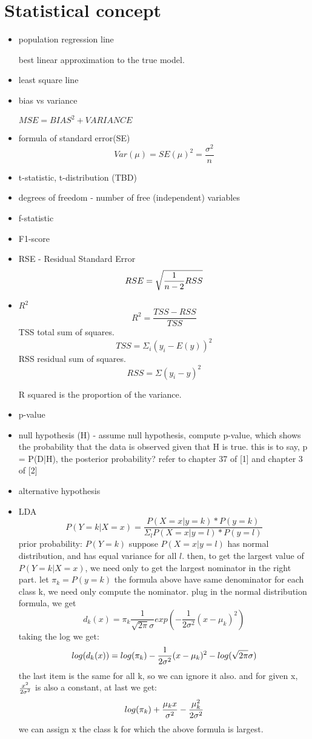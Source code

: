 \documentclass[10pt,a4paper]{book}
\begin{document}
\section{Statistical concept}
\begin{itemize}
\item
population regression line

best linear approximation to the true model.
\item least square line

\item bias vs variance

$MSE = BIAS^2 + VARIANCE$


\item formula of standard error(SE)
$$ Var(\mu) = SE(\mu)^2 = \frac {\sigma^2} {n} $$

\item t-statistic, t-distribution (TBD)

\item degrees of freedom - number of free (independent) variables

\item f-statistic
\item F1-score
\item RSE - Residual Standard Error
$$RSE = \sqrt{{1 \over {n-2}} RSS}$$
\item $R^2$   
$$R^2 = {\frac {TSS - RSS} {TSS}}$$
TSS total sum of squares. 
$$TSS = \Sigma_i(y_i - E(y))^2$$  
RSS residual sum of squares. 
$$RSS = \Sigma(y_i - y)^2$$

R squared is the proportion of the variance.

\item p-value  
\item null hypothesis (H) - assume null hypothesis, compute p-value, which shows the probability that the data is observed given that H is true. this is to say, p = P(D|H), the posterior probability? refer to chapter 37 of [1] and chapter 3 of [2]

\item alternative hypothesis

\item LDA  
$$ P(Y=k|X=x) = \frac {P(X=x|y=k) * P(y=k)}  {\Sigma_l P(X=x|y=l) * P(y=l) }$$
prior probability: $P(Y=k)$   
suppose $P(X=x|y=l)$ has normal distribution, and has equal variance for all $l$. then, to get the largest value of $P(Y=k|X=x)$, we need only to get the largest nominator in the right part.  
let $\pi_k = P(y=k)$
the formula above have same denominator for each class k, we need only compute the nominator. plug in the normal distribution formula, we get
$$ d_k(x) = \pi_k{\frac 1 {\sqrt{2\pi} \sigma }} exp({-{\frac 1 {2 \sigma^2}}(x - \mu_k)^2}) $$  
taking the log we get:  
$$log(d_k(x)) = log(\pi_k) -{1 \over 2 \sigma^2}(x - \mu_k)^2 - log(\sqrt{2\pi} \sigma) $$  
the last item is the same for all k, so we can ignore it also.  
and for given x, $x^2 \over {2 \sigma^2}$ is also a constant, at last we get:  
$$log(\pi_k) + {\mu_k x \over \sigma^2} - {\mu_k^2 \over 2 \sigma^2}$$
we can assign  x the class k for which the above formula is largest.

\end{itemize}
\end{document}
